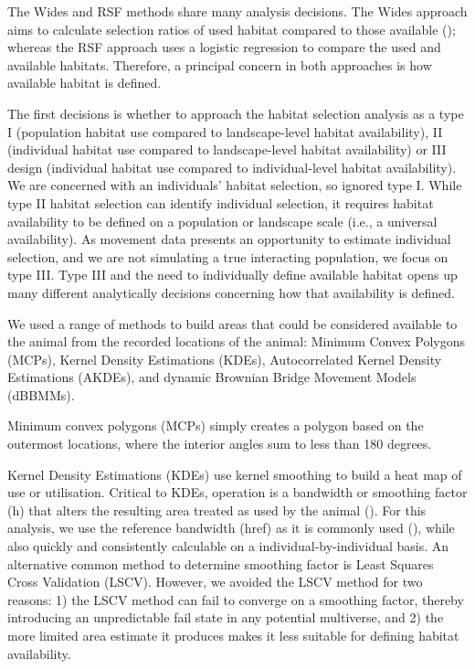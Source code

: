 \documentclass[10pt,a4paper]{article}
\begin{document}
The Wides and RSF methods share many analysis decisions.
The Wides approach aims to calculate selection ratios of used habitat compared to those available (); whereas the RSF approach uses a logistic regression to compare the used and available habitats.
Therefore, a principal concern in both approaches is how available habitat is defined.

The first decisions is whether to approach the habitat selection analysis as a type I (population habitat use compared to landscape-level habitat availability), II (individual habitat use compared to landscape-level habitat availability) or III design (individual habitat use compared to individual-level habitat availability).
We are concerned with an individuals' habitat selection, so ignored type I.
While type II habitat selection can identify individual selection, it requires habitat availability to be defined on a population or landscape scale (i.e., a universal availability).
As movement data presents an opportunity to estimate individual selection, and we are not simulating a true interacting population, we focus on type III.
Type III and the need to individually define available habitat opens up many different analytically decisions concerning how that availability is defined.

We used a range of methods to build areas that could be considered available to the animal from the recorded locations of the animal: Minimum Convex Polygons (MCPs), Kernel Density Estimations (KDEs), Autocorrelated Kernel Density Estimations (AKDEs), and dynamic Brownian Bridge Movement Models (dBBMMs).

Minimum convex polygons (MCPs) simply creates a polygon based on the outermost locations, where the interior angles sum to less than 180 degrees.

Kernel Density Estimations (KDEs) use kernel smoothing to build a heat map of use or utilisation.
Critical to KDEs, operation is a bandwidth or smoothing factor (h) that alters the resulting area treated as used by the animal ().
For this analysis, we use the reference bandwidth (href) as it is commonly used (), while also quickly and consistently calculable on a individual-by-individual basis.
An alternative common method to determine smoothing factor is Least Squares Cross Validation (LSCV).
However, we avoided the LSCV method for two reasons: 1) the LSCV method can fail to converge on a smoothing factor, thereby introducing an unpredictable fail state in any potential multiverse, and 2) the more limited area estimate it produces makes it less suitable for defining habitat availability.
\end{document}

